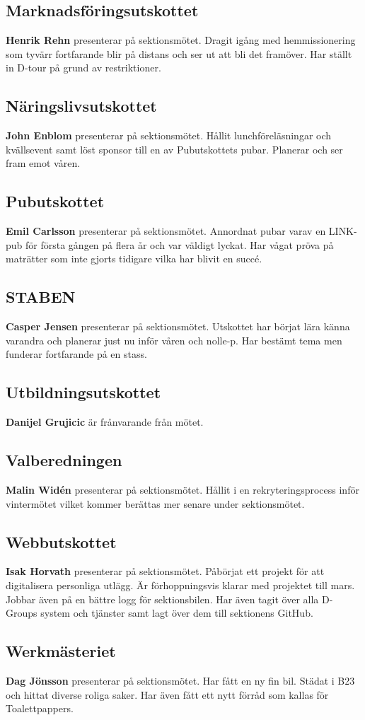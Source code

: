 \documentclass[../protokoll_vintermote_2022.tex]{subfiles}
\begin{document}
\subsection{Marknadsföringsutskottet}
\textbf{Henrik Rehn} presenterar på sektionsmötet.
Dragit igång med hemmissionering som tyvärr fortfarande blir på distans och ser ut att bli det framöver. Har ställt in D-tour på grund av restriktioner.

\subsection{Näringslivsutskottet}
\textbf{John Enblom} presenterar på sektionsmötet.
Hållit lunchföreläsningar och kvällsevent samt löst sponsor till en av Pubutskottets pubar. Planerar och ser fram emot våren.

\subsection{Pubutskottet}
\textbf{Emil Carlsson} presenterar på sektionsmötet.
Annordnat pubar varav en LINK-pub för första gången på flera år och var väldigt lyckat. Har vågat pröva på maträtter som inte gjorts tidigare vilka har blivit en succé.

\subsection{STABEN}
\textbf{Casper Jensen} presenterar på sektionsmötet.
Utskottet har börjat lära känna varandra och planerar just nu inför våren och nolle-p. Har bestämt tema men funderar fortfarande på en stass.

\subsection{Utbildningsutskottet}
\textbf{Danijel Grujicic} är frånvarande från mötet.

\subsection{Valberedningen}
\textbf{Malin Widén} presenterar på sektionsmötet.
Hållit i en rekryteringsprocess inför vintermötet vilket kommer berättas mer senare under sektionsmötet.

\subsection{Webbutskottet}
\textbf{Isak Horvath} presenterar på sektionsmötet.
Påbörjat ett projekt för att digitalisera personliga utlägg. Är förhoppningsvis klarar med projektet till mars. Jobbar även på en bättre logg för sektionsbilen. Har även tagit över alla D-Groups system och tjänster samt lagt över dem till sektionens GitHub.

\subsection{Werkmästeriet}
\textbf{Dag Jönsson} presenterar på sektionsmötet.
Har fått en ny fin bil. Städat i B23 och hittat diverse roliga saker. Har även fått ett nytt förråd som kallas för Toalettpappers.
\end{document}
